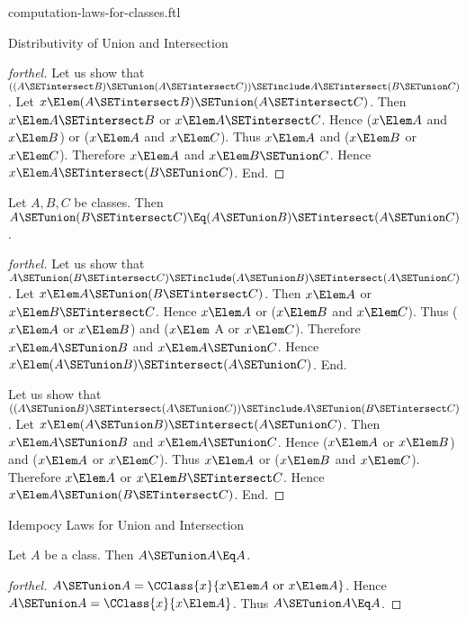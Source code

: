\documentclass{stex}
\begin{document}
\begin{smodule}{computation-laws-for-classes.ftl}
\begin{sfragment}{Distributivity of Union and Intersection}
\begin{proof}[forthel]
    Let us show that $((A \SETintersect B) \SETunion (A \SETintersect C)) \SETinclude A \SETintersect (B \SETunion C)$. %
      Let $x \Elem (A \SETintersect B) \SETunion (A \SETintersect C)$.
      Then $x \Elem A \SETintersect B$ or $x \Elem A \SETintersect C$.
      Hence ($x \Elem A$ and $x \Elem B$) or ($x \Elem A$ and $x \Elem C$).
      Thus $x \Elem A$ and ($x \Elem B$ or $x \Elem C$).
      Therefore $x \Elem A$ and $x \Elem B \SETunion C$.
      Hence$ x \Elem A \SETintersect (B \SETunion C)$.
    End.
  \end{proof}

  \begin{proposition}[forthel,id=FOUNDATIONS_02_5937390721957888]
    Let $A, B, C$ be classes.
    Then $A \SETunion (B \SETintersect C) \Eq (A \SETunion B) \SETintersect (A \SETunion C)$.
  \end{proposition}
  \begin{proof}[forthel]
    Let us show that $A \SETunion (B \SETintersect C) \SETinclude (A \SETunion B) \SETintersect (A \SETunion C)$.
      Let $x \Elem A \SETunion (B \SETintersect C)$.
      Then $x \Elem A$ or $x \Elem B \SETintersect C$.
      Hence $x \Elem A$ or ($x \Elem B$ and $x \Elem C$).
      Thus ($x \Elem A$ or $x \Elem B$) and ($x \Elem$ A or $x \Elem C$).
      Therefore $x \Elem A \SETunion B$ and $x \Elem A \SETunion C$.
      Hence $x \Elem (A \SETunion B) \SETintersect (A \SETunion C)$.
    End.

    Let us show that $((A \SETunion B) \SETintersect (A \SETunion C)) \SETinclude A \SETunion (B \SETintersect C)$. %
      Let $x \Elem (A \SETunion B) \SETintersect (A \SETunion C)$.
      Then $x \Elem A \SETunion B$ and $x \Elem A \SETunion C$.
      Hence ($x \Elem A$ or $x \Elem B$) and ($x \Elem A$ or $x \Elem C$).
      Thus $x \Elem A$ or ($x \Elem B$ and $x \Elem C$).
      Therefore $x \Elem A$ or $x \Elem B \SETintersect C$.
      Hence $x \Elem A \SETunion (B \SETintersect C)$.
    End.
  \end{proof}
\end{sfragment}

\begin{sfragment}{Idempocy Laws for Union and Intersection}
  \begin{proposition}[forthel,id=FOUNDATIONS_02_2096996737351680]
    Let $A$ be a class.
    Then $A \SETunion A \Eq A$.
  \end{proposition}
  \begin{proof}[forthel]
    $A \SETunion A = \CClass{x}{x \Elem A\text{ or }x \Elem A}$.
    Hence $A \SETunion A = \CClass{x}{x \Elem A}$.
    Thus $A \SETunion A \Eq A$.
  \end{proof}


\end{sfragment}
\end{smodule}
\end{document}
